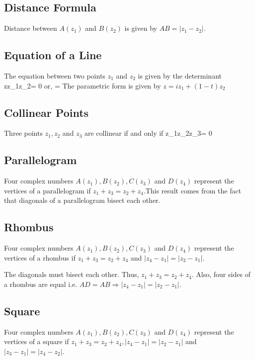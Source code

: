 \subsection{Distance Formula}
Distance between $A(z_1)$ and $B(z_2)$ is given by $AB = |z_1 - z_2|$.
\subsection{Equation of a Line}
The equation between two points $z_1$ and $z_2$ is given by the determinant
\startformula \startdeterminant \NC z\NC{}\NR \NC z_1\NC{}\NR \NC z_2\NC{}\NR \stopdeterminant = 0\stopformula
or,
\startformula {} = \stopformula
The parametric form is given by $z = iz_1 + (1 - t)z_2$
\subsection{Collinear Points}
Three points $z_1, z_2$ and $z_3$ are collinear if and only if
\startformula \startdeterminant \NC z_1\NC{}\NR\NC z_2\NC{}\NR\NC z_3\NC{}\NR\stopdeterminant = 0\stopformula
\subsection{Parallelogram}
Four complex numbers $A(z_1), B(z_2), C(z_3)$ and $D(z_4)$ represent the vertices of a parallelogram if $z_1 + z_3 = z_2 +
z_4$.This result comes from the fact that diagonals of a parallelogram bisect each other.

\startplacefigure[title={Parallelogram}]
\stopplacefigure

\subsection{Rhombus}
Four complex numbers $A(z_1), B(z_2), C(z_3)$ and $D(z_4)$ represent the vertices of a rhombus if $z_1 + z_3 = z_2 + z_4$ and
$|z_4 - z_1| = |z_2 - z_1|$.

\startplacefigure[title={Rhombus}]
\stopplacefigure

The diagonals must bisect each other. Thus, $z_1 + z_3 = z_2 + z_4.$ Also, four sides of a rhombus are equal i.e. $AD = AB
\Rightarrow |z_4 - z_1| = |z_2 - z_1|$.

\subsection{Square}
Four complex numbers $A(z_1), B(z_2), C(z_3)$ and $D(z_4)$ represent the vertices of a square if $z_1 + z_3 = z_2 + z_4,
|z_4 - z_1| = |z_2 - z_1|$ and $|z_3 - z_1| = |z_4 - z_2|$.


